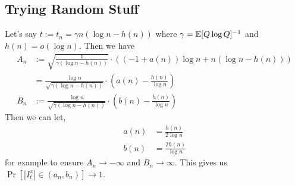 \documentclass[12pt]{article}
\begin{document}
\subsection{Trying Random Stuff}

Let's say $t := t_n = \gamma n (\log n - h(n))$ where $\gamma = \mathbb{E}[Q \log Q]^{-1}$ and $h(n) = o(\log n)$. Then we have 
\begin{align*}
	A_n & := \sqrt{\frac{1}{\gamma (\log n - h(n))}} \cdot \left ( (-1 + a(n)) \log n + n(\log n - h(n)) \right ) \\
	& = \frac{\log n}{\sqrt{\gamma (\log n - h(n)) }} \cdot \left ( a(n) - \frac{h(n)}{\log n} \right ) \\
	B_n & := \frac{\log n}{\sqrt{\gamma (\log n - h(n)) }} \cdot \left ( b(n) - \frac{h(n)}{\log n} \right )
\end{align*}
Then we can let, 
\begin{align*}
	a(n) & = \frac{h(n)}{2 \log n} \\
	b(n) & = \frac{2h(n)}{\log n}
\end{align*}
for example to ensure $A_n \to - \infty$ and $B_n \to \infty$. This gives us $\Pr[|I_t^x| \in (a_n, b_n)] \to 1$.
\newpage 


\end{document}
